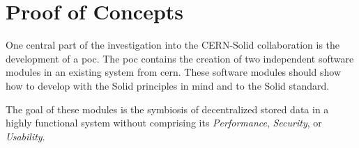 \section{Proof of Concepts}

One central part of the investigation into the CERN-Solid collaboration is the development of a \gls{poc}. The \gls{poc} contains the creation of two independent software modules in an existing system from \gls{cern}. These software modules should show how to develop with the Solid principles in mind and to the Solid standard.

The goal of these modules is the symbiosis of decentralized stored data in a highly functional system without comprising its \textit{Performance}, \textit{Security}, or \textit{Usability}.


\newpage

\newpage

